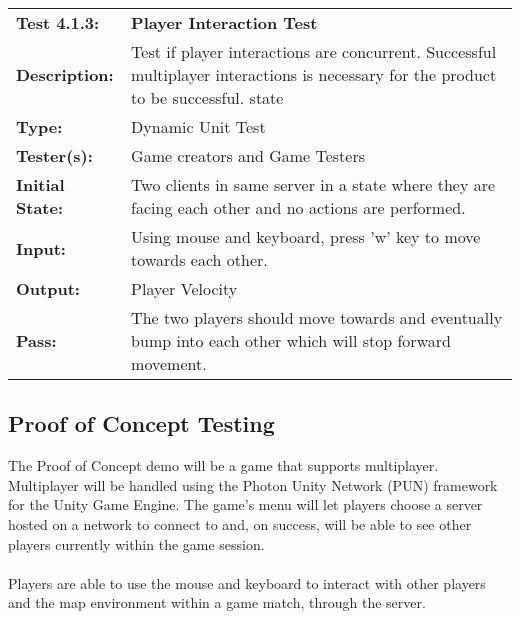 \documentclass[12pt, titlepage]{article}
\begin{document}
\begin{mdframed}[linewidth=1pt]
\begin{tabularx}{\textwidth}{@{}p{3cm}X@{}}
{\bf Test 4.1.3:} & {\bf Player Interaction Test}\\[\baselineskip]
{\bf Description:} & Test if player interactions are concurrent. Successful multiplayer interactions is necessary for the product to be successful. state\\[0.5\baselineskip]
{\bf Type:} & Dynamic Unit Test\\[0.5\baselineskip]
{\bf Tester(s):} & Game creators and Game Testers\\[0.5\baselineskip]
{\bf Initial State:} & Two clients in same server in a state where they are facing each other and no actions are performed.\\[0.5\baselineskip]
{\bf Input:} & Using mouse and keyboard, press 'w' key to move towards each other.\\[0.5\baselineskip]
{\bf Output:} & Player Velocity\\[0.5\baselineskip]
{\bf Pass:} & The two players should move towards and eventually bump into each other which will stop forward movement.
\end{tabularx}
\end{mdframed}

\subsection{Proof of Concept Testing}
The Proof of Concept demo will be a game that supports multiplayer. Multiplayer will be handled using the Photon Unity Network (PUN) framework for the Unity Game Engine. 
The game's menu will let players choose a server hosted on a network to connect to and, on success, will be able to see other players currently within the game session.

\paragraph{}
Players are able to use the mouse and keyboard to interact with other players and the map environment within a game match, through the server.
\end{document}
